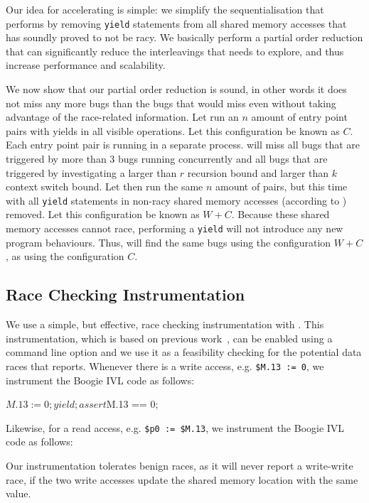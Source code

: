 Our idea for accelerating \corral is simple: we simplify the sequentialisation that \corral performs by removing \texttt{yield} statements from all shared memory accesses that \whoop has soundly proved to not be racy. We basically perform a partial order reduction that can significantly reduce the interleavings that \corral needs to explore, and thus increase performance and scalability.

We now show that our partial order reduction is sound, in other words it does not miss any more bugs than the bugs that \corral would miss even without taking advantage of the \whoop race-related information. Let \corral run an $n$ amount of entry point pairs with yields in all visible operations. Let this configuration be known as $C$. Each entry point pair is running in a separate \corral process. \corral will miss all bugs that are triggered by more than 3 bugs running concurrently and all bugs that are triggered by investigating a larger than $r$ recursion bound and larger than $k$ context switch bound. Let \corral then run the same $n$ amount of pairs, but this time with all \texttt{yield} statements in non-racy shared memory accesses (according to \whoop) removed. Let this configuration be known as $W+C$. Because these shared memory accesses cannot race, performing a \texttt{yield} will not introduce any new program behaviours. Thus, \corral will find the same bugs using the configuration $W+C$, as using the configuration $C$.

\subsection{Race Checking Instrumentation}
\label{bf:racechecking}

We use a simple, but effective, race checking instrumentation with \corral. This instrumentation, which is based on previous work~\cite{}, can be enabled using a command line option and we use it as a feasibility checking for the potential data races that \whoop reports. Whenever there is a write access, e.g. \texttt{\$M.13 := 0}, we instrument the Boogie IVL code as follows:

\begin{boogie}
$M.13 := 0;
yield;
assert $M.13 == 0;
\end{boogie}

Likewise, for a read access, e.g. \texttt{\$p0 := \$M.13}, we instrument the Boogie IVL code as follows:


Our instrumentation tolerates benign races, as it will never report a write-write race, if the two write accesses update the shared memory location with the same value.